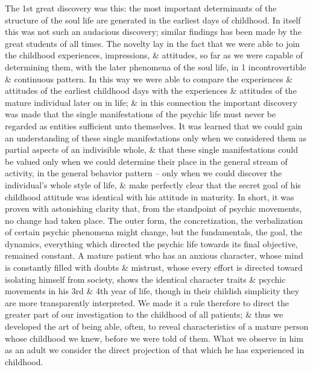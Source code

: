 \documentclass{article}
\begin{document}
The 1st great discovery was this: the most important determinants of the structure of the soul life are generated in the earliest days of childhood. In itself this was not such an audacious discovery; similar findings has been made by the great students of all times. The novelty lay in the fact that we were able to join the childhood experiences, impressions, \& attitudes, so far as we were capable of determining them, with the later phenomena of the soul life, in 1 incontrovertible \& continuous pattern. In this way we were able to compare the experiences \& attitudes of the earliest childhood days with the experiences \& attitudes of the mature individual later on in life; \& in this connection the important discovery was made that the single manifestations of the psychic life must never be regarded as entities sufficient unto themselves. It was learned that we could gain an understanding of these single manifestations only when we considered them as partial aspects of an indivisible whole, \& that these single manifestations could be valued only when we could determine their place in the general stream of activity, in the general behavior pattern -- only when we could discover the individual's whole style of life, \& make perfectly clear that the secret goal of his childhood attitude was identical with his attitude in maturity. In short, it was proven with astonishing clarity that, from the standpoint of psychic movements, no change had taken place. The outer form, the concretization, the verbalization of certain psychic phenomena might change, but the fundamentals, the goal, the dynamics, everything which directed the psychic life towards its final objective, remained constant. A mature patient who has an anxious character, whose mind is constantly filled with doubts \& mistrust, whose every effort is directed toward isolating himself from society, shows the identical character traits \& psychic movements in his 3rd \& 4th year of life, though in their childish simplicity they are more transparently interpreted. We made it a rule therefore to direct the greater part of our investigation to the childhood of all patients; \& thus we developed the art of being able, often, to reveal characteristics of a mature person whose childhood  we knew, before we were told of them. What we observe in him as an adult we consider the direct projection of that which he has experienced in childhood.
\end{document}
